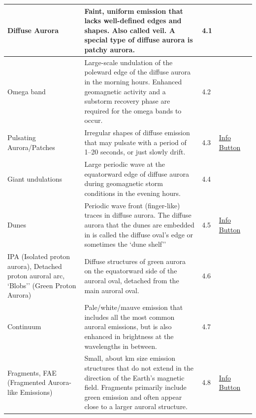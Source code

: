 \documentclass{article}
\begin{document}
\begin{longtable}{|p{1.5cm}|p{6.5cm}|p{1cm}|p{1.75cm}|p{1.8cm}|}
Diffuse Aurora & Faint, uniform emission that lacks well-defined edges and shapes. Also called veil. A special type of diffuse aurora is patchy aurora. & 4.1 &  & \textcite{Nishimura2020} \\
\hline
Omega band & Large-scale undulation of the poleward edge of the diffuse aurora in the morning hours. Enhanced geomagnetic activity and a substorm recovery phase are required for the omega bands to occur. & 4.2 &  & \textcite{Sato2017} \\
\hline
Pulsating Aurora/Patches & Irregular shapes of diffuse emission that may pulsate with a period of 1--20 seconds, or just slowly drift. & 4.3 & \href{https://www.taivaanvahti.fi/observations/info/1031/en}{Info Button} & \textcite{Nishimura2020} \\
\hline
Giant undulations & Large periodic wave at the equatorward edge of diffuse aurora during geomagnetic storm conditions in the evening hours. & 4.4 &  & \textcite{Zou2021} \\
\hline
Dunes & Periodic wave front (finger-like) traces in diffuse aurora. The diffuse aurora that the dunes are embedded in is called the diffuse oval's edge or sometimes the `dune shelf'' & 4.5 & \href{https://www.taivaanvahti.fi/observations/info/546/en}{Info Button} & \textcite{Palmroth2020}\\
\hline
IPA (Isolated proton aurora), Detached proton auroral arc, `Blobs'' (Green Proton Aurora) & Diffuse structures of green aurora on the equatorward side of the auroral oval, detached from the main auroral oval. & 4.6 &  & \textcite{Liang2022} \\
\hline
Continuum & Pale/white/mauve emission that includes all the most common auroral emissions, but is also enhanced in brightness at the wavelengths in between. & 4.7 &  & \textcite{Gillies2019} \\
\hline
Fragments, FAE (Fragmented Aurora-like Emissions) & Small, about km size emission structures that do not extend in the direction of the Earth's magnetic field. Fragments primarily include green emission and often appear close to a larger auroral structure. & 4.8 & \href{https://www.taivaanvahti.fi/observations/info/1031/en}{Info Button} & \textcite{Dreyer2021}\\
\hline


\end{longtable}
\end{document}
